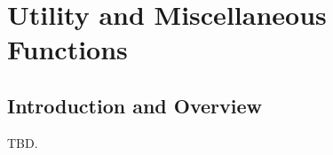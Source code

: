 \chapter{Utility and Miscellaneous Functions}
\label{cnef0}

\section{Introduction and Overview}
\label{cnef0:siov0}

TBD.

